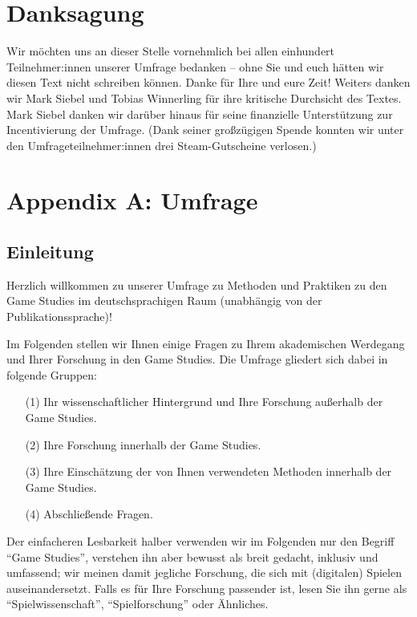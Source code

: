 \documentclass{scrartcl}
\begin{document}
\section*{Danksagung}
Wir möchten uns an dieser Stelle vornehmlich bei allen einhundert Teilnehmer:innen unserer Umfrage bedanken -- ohne Sie und euch hätten wir diesen Text nicht schreiben können.
Danke für Ihre und eure Zeit!
Weiters danken wir Mark Siebel und Tobias Winnerling für ihre kritische Durchsicht des Textes.
Mark Siebel danken wir darüber hinaus für seine finanzielle Unterstützung zur Incentivierung der Umfrage.
(Dank seiner großzügigen Spende konnten wir unter den Umfrageteilnehmer:innen drei Steam-Gutscheine verlosen.)


\printbibliography


\clearpage
\section*{Appendix A: Umfrage}


\subsection*{Einleitung}
Herzlich willkommen zu unserer Umfrage zu Methoden und Praktiken zu den Game Studies im deutschsprachigen Raum (unabhängig von der Publikationssprache)!

Im Folgenden stellen wir Ihnen einige Fragen zu Ihrem akademischen Werdegang und Ihrer Forschung in den Game Studies.
Die Umfrage gliedert sich dabei in folgende Gruppen:

\begin{itemize}
   \item[(1)] Ihr wissenschaftlicher Hintergrund und Ihre Forschung außerhalb der Game Studies.
   \item[(2)] Ihre Forschung innerhalb der Game Studies.
   \item[(3)] Ihre Einschätzung der von Ihnen verwendeten Methoden innerhalb der Game Studies.
   \item[(4)] Abschließende Fragen.
\end{itemize}

\noindent Der einfacheren Lesbarkeit halber verwenden wir im Folgenden nur den Begriff \enquote{Game Studies}, verstehen ihn aber bewusst als breit gedacht, inklusiv und umfassend; wir meinen damit jegliche Forschung, die sich mit (digitalen) Spielen auseinandersetzt.
Falls es für Ihre Forschung passender ist, lesen Sie ihn gerne als \enquote{Spielwissenschaft}, \enquote{Spielforschung} oder Ähnliches.
\end{document}

